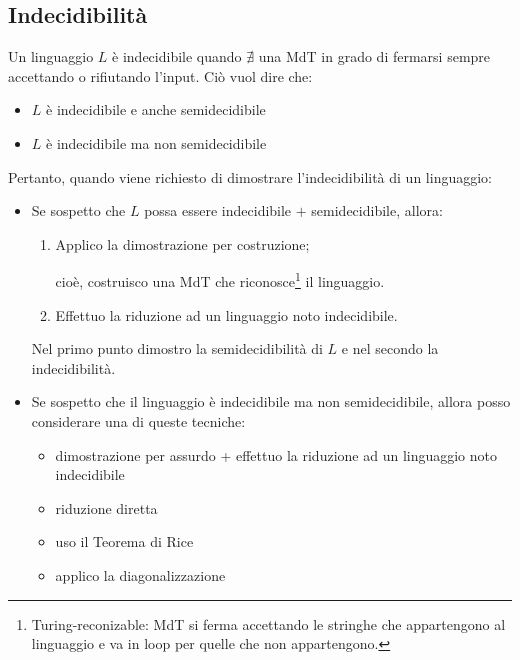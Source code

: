 \documentclass{article}  %
\theoremstyle{definition}
\begin{document}
\subsection{Indecidibilità}
Un linguaggio $L$ è indecidibile quando $\nexists$ una MdT in grado di fermarsi sempre accettando o rifiutando l'input. Ciò vuol dire che:
\begin{itemize}
  \item $L$ è indecidibile e anche semidecidibile
  \item $L$ è indecidibile ma non semidecidibile
\end{itemize}
Pertanto, quando viene richiesto di dimostrare l'indecidibilità di un linguaggio:
\begin{itemize}
  \item Se sospetto che $L$ possa essere indecidibile $+$ semidecidibile, allora:
  \begin{enumerate}
    \item Applico la dimostrazione per costruzione; 
   
  cioè, costruisco una MdT che riconosce\footnote{Turing-reconizable: MdT si ferma accettando le stringhe che appartengono al linguaggio e va in loop
  per quelle che non appartengono.} il linguaggio. 
   \item Effettuo la riduzione ad un linguaggio noto indecidibile. 
  \end{enumerate}
  Nel primo punto dimostro la semidecidibilità di $L$ e nel secondo la indecidibilità.
  \item Se sospetto che il linguaggio è indecidibile ma non semidecidibile, allora posso considerare una di queste tecniche:
  \begin{center}
  \end{center}

  \begin{itemize}
    \item dimostrazione per assurdo + effettuo la riduzione ad un linguaggio noto indecidibile
    \item riduzione diretta 
    \item uso il Teorema di Rice
    \item applico la diagonalizzazione
  \end{itemize}
\end{itemize}
\end{document}
